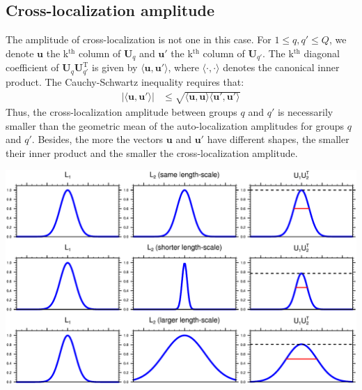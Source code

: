 \documentclass[12pt]{scrartcl}
\begin{document}
\subsection{Cross-localization amplitude}
The amplitude of cross-localization is not one in this case. For $1 \le q,q' \le Q$, we denote $\mathbf{u}$ the k$^\textrm{th}$ column of $\mathbf{U}_q$ and $\mathbf{u}'$ the k$^\textrm{th}$ column of $\mathbf{U}_{q'}$. The k$^\textrm{th}$ diagonal coefficient of $\mathbf{U}_q \mathbf{U}_{q'}^\mathrm{T}$ is given by $\langle \mathbf{u},\mathbf{u}' \rangle$, where $\langle \cdot, \cdot \rangle$ denotes the canonical inner product. The Cauchy-Schwartz inequality requires that:
\begin{align}
\vert \langle \mathbf{u},\mathbf{u}' \rangle \vert & \le \sqrt{\langle \mathbf{u},\mathbf{u} \rangle \langle \mathbf{u}',\mathbf{u}' \rangle}
\end{align}
Thus, the cross-localization amplitude between groups $q$ and $q'$ is necessarily smaller than the geometric mean of the auto-localization amplitudes for groups $q$ and $q'$. Besides, the more the vectors $\mathbf{u}$ and $\mathbf{u}'$ have different shapes, the smaller their inner product and the smaller the cross-localization amplitude.
\begin{center}
\includegraphics[width=\linewidth]{convolution_exp.pdf}
\end{center}



\end{document}
